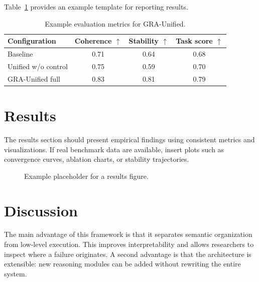 \documentclass[11pt,a4paper]{article}
\begin{document}
Table~\ref{tab:metrics} provides an example template for reporting results.

\begin{table}[H]
    \centering
    \caption{Example evaluation metrics for GRA-Unified.}
    \label{tab:metrics}
    \begin{tabular}{lccc}
        \toprule
        Configuration & Coherence $\uparrow$ & Stability $\uparrow$ & Task score $\uparrow$ \\
        \midrule
        Baseline & 0.71 & 0.64 & 0.68 \\
        Unified w/o control & 0.75 & 0.59 & 0.70 \\
        GRA-Unified full & 0.83 & 0.81 & 0.79 \\
        \bottomrule
    \end{tabular}
\end{table}

\section{Results}
The results section should present empirical findings using consistent metrics and visualizations. If real benchmark data are available, insert plots such as convergence curves, ablation charts, or stability trajectories.

\begin{figure}[H]
    \centering
    \caption{Example placeholder for a results figure.}
    \label{fig:results}
\end{figure}

\section{Discussion}
The main advantage of this framework is that it separates semantic organization from low-level execution. This improves interpretability and allows researchers to inspect where a failure originates. A second advantage is that the architecture is extensible: new reasoning modules can be added without rewriting the entire system.
\end{document}
